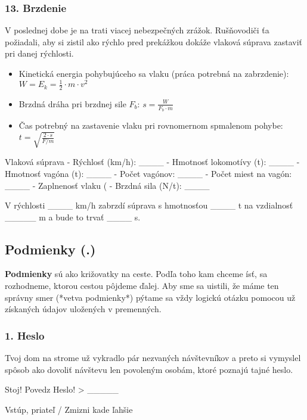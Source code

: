 \subsubsection*{13. Brzdenie}
V poslednej dobe je na trati viacej nebezpečných zrážok. Rušňovodiči ťa požiadali, aby si zistil ako rýchlo pred prekážkou dokáže vlaková súprava zastaviť pri danej rýchlosti.

\begin{itemize}
\itemsep0pt
\item Kinetická energia pohybujúceho sa vlaku (práca potrebná na zabrzdenie): $ W = E_k = \frac{1}{2} \cdot m \cdot v^2 $
\item Brzdná dráha pri brzdnej sile $F_b$: $ s = \frac{W}{F_b \cdot m} $
\item Čas potrebný na zastavenie vlaku pri rovnomernom spmalenom pohybe: $ t = \sqrt{\frac{2 \cdot s}{F / m}} $
\end{itemize}

\begin{code}
Vlaková súprava
- Rýchlosť (km/h): ____
- Hmotnosť lokomotívy (t): ____
- Hmotnosť vagóna (t): ____
- Počet vagónov: ____
- Počet miest na vagón: ____
- Zaplnenosť vlaku (%
- Brzdná sila (N/t): ____

V rýchlosti ____ km/h zabrzdí súprava s hmotnosťou ____ t na vzdialnosť _____ m a bude to trvať ____ s.
\end{code}


\subsection{Podmienky (.)}
\textbf{Podmienky} sú ako križovatky na ceste. Podľa toho kam chceme ísť, sa rozhodneme, ktorou cestou pôjdeme ďalej. Aby sme sa uistili, že máme ten správny smer (*vetva podmienky*) pýtame sa vždy logickú otázku pomocou už získaných údajov uložených v premenných.

\subsubsection*{1. Heslo}
Tvoj dom na strome už vykradlo pár nezvaných návštevníkov a preto si vymyslel spôsob ako dovoliť návštevu len povoleným osobám, ktoré poznajú tajné heslo.

\begin{code}
Stoj! Povedz Heslo!
> _____

Vstúp, priateľ /   Zmizni kade ľahšie
\end{code}


